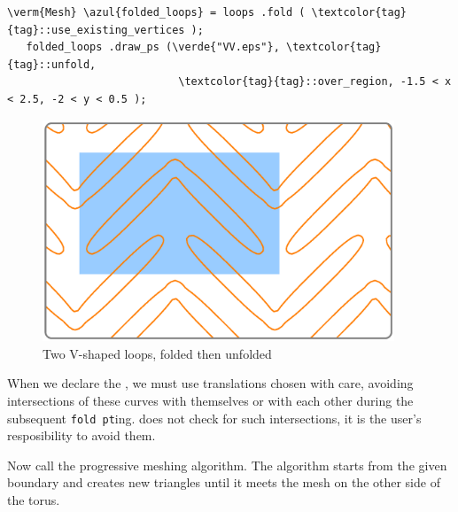 \begin{Verbatim}[commandchars=\\\{\},formatcom=\small\tt,frame=single,
   rulecolor=\color{coment},baselinestretch=0.94,framesep=2mm         ]
   \verm{Mesh} \azul{folded_loops} = loops .fold ( \textcolor{tag}{tag}::use_existing_vertices );
   folded_loops .draw_ps (\verde{"VV.eps"}, \textcolor{tag}{tag}::unfold,
                           \textcolor{tag}{tag}::over_region, -1.5 < x < 2.5, -2 < y < 0.5 );
\end{Verbatim}

\begin{figure}[ht] \centering
  \includegraphics[width=105mm]{boomerang-2.eps}
  \caption{Two V-shaped loops, folded then unfolded}
  \label{\numb section 7.\numb fig 15}
\end{figure}

When we declare the {\small\tt{}}, we must use translations chosen with care,
avoiding intersections of these curves with themselves or with each other during the subsequent
\mbox{{\small\tt fold pt}ing}.
\ManiFEM{} does not check for such intersections, it is the user's resposibility to avoid them.

Now call the progressive meshing algorithm.
The algorithm starts from the given boundary and creates new triangles until
it meets the mesh on the other side of the torus.

